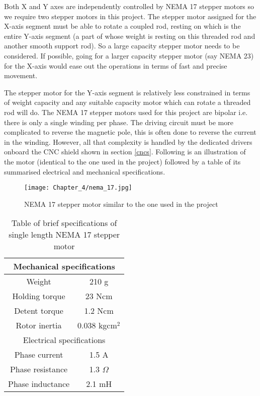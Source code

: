 Both X and Y axes are independently controlled by NEMA 17 stepper motors so we require two stepper motors in this project. The stepper motor assigned for the X-axis segment must be able to rotate a coupled rod, resting on which is the entire Y-axis segment (a part of whose weight is resting on this threaded rod and another smooth support rod). So a large capacity stepper motor needs to be considered. If possible, going for a larger capacity stepper motor (say NEMA 23) for the X-axis would ease out the operations in terms of fast and precise movement. \par

The stepper motor for the Y-axis segment is relatively less constrained in terms of weight capacity and any suitable capacity motor which can rotate a threaded rod will do. The NEMA 17 stepper motors used for this project are bipolar i.e. there is only a single winding per phase. The driving circuit must be more complicated to reverse the magnetic pole, this is often done to reverse the current in the winding. However, all that complexity is handled by the dedicated drivers onboard the CNC shield shown in section \ref{cncs}. Following is an illustration of the motor (identical to the one used in the project) followed by a table of its summarised electrical and mechanical specifications.

\begin{figure}[h]
 \centering
 \texttt{[image: Chapter\_4/nema\_17.jpg]}
 \caption{NEMA 17 stepper motor similar to the one used in the project}
 \label{fig:stepper}
\end{figure}

\begin{table}[h]
\def\arraystretch{1.5}
    \centering
    \caption{Table of brief specifications of single length NEMA 17 stepper motor}
    \begin{tabular}{|c|c|}
        \hline
		\multicolumn{2}{|c|}{Mechanical specifications} \\
		\hline
		Weight & 210 g \\
		\hline
		Holding torque & 23 Ncm \\ 
		\hline 
		Detent torque & 1.2 Ncm \\
		\hline
		Rotor inertia & 0.038 kgcm$^{2}$ \\
		\hline
		\multicolumn{2}{|c|}{Electrical specifications} \\
		\hline
	    Phase current & 1.5 A \\
		\hline
		Phase resistance &	1.3 $\Omega$ \\
		\hline
		Phase inductance & 2.1 mH \\
		\hline
    \end{tabular}
    \label{tab:step_specs}
\end{table}


